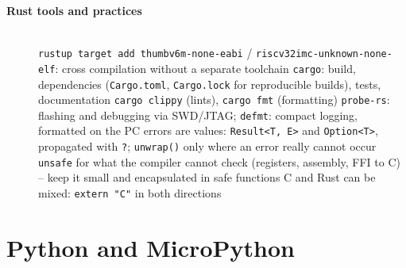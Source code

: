 \begin{description}
\item[{\rot\bf Rust tools and practices}]~\\[-\lblskip]
\bi
	\ite \texttt{rustup target add thumbv6m-none-eabi} / \texttt{riscv32imc-unknown-none-elf}: cross compilation without a separate toolchain
	\ite \texttt{cargo}: build, dependencies (\texttt{Cargo.toml}, \texttt{Cargo.lock} for reproducible builds), tests, documentation
	\ite \texttt{cargo clippy} (lints), \texttt{cargo fmt} (formatting)
	\ite \texttt{probe-rs}: flashing and debugging via SWD/JTAG; \texttt{defmt}: compact logging, formatted on the PC
	\ite errors are values: \texttt{Result<T, E>} and \texttt{Option<T>}, propagated with \texttt{?}; \texttt{unwrap()} only where an error really cannot occur
	\ite \texttt{unsafe} for what the compiler cannot check (registers, assembly, FFI to C) -- keep it small and encapsulated in safe functions
	\ite C and Rust can be mixed: \texttt{extern "C"} in both directions
\ei
\os{\newpage}
\end{description}

\section{Python and MicroPython}

